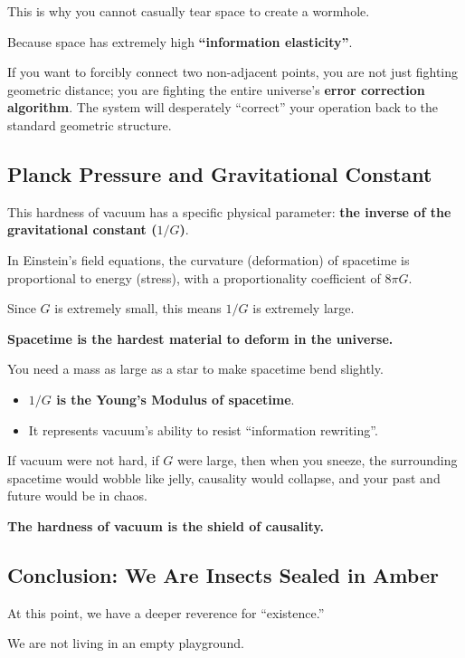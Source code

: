 This is why you cannot casually tear space to create a wormhole.

Because space has extremely high \textbf{``information elasticity''}.

If you want to forcibly connect two non-adjacent points, you are not just fighting geometric distance; you are fighting the entire universe's \textbf{error correction algorithm}. The system will desperately ``correct'' your operation back to the standard geometric structure.

\subsection{Planck Pressure and Gravitational Constant}

This hardness of vacuum has a specific physical parameter: \textbf{the inverse of the gravitational constant ($1/G$)}.

In Einstein's field equations, the curvature (deformation) of spacetime is proportional to energy (stress), with a proportionality coefficient of $8\pi G$.

Since $G$ is extremely small, this means $1/G$ is extremely large.

\textbf{Spacetime is the hardest material to deform in the universe.}

You need a mass as large as a star to make spacetime bend slightly.

\begin{itemize}
\item \textbf{$1/G$ is the Young's Modulus of spacetime}.

\item It represents vacuum's ability to resist ``information rewriting''.
\end{itemize}

If vacuum were not hard, if $G$ were large, then when you sneeze, the surrounding spacetime would wobble like jelly, causality would collapse, and your past and future would be in chaos.

\textbf{The hardness of vacuum is the shield of causality.}

\subsection{Conclusion: We Are Insects Sealed in Amber}

At this point, we have a deeper reverence for ``existence.''

We are not living in an empty playground.

